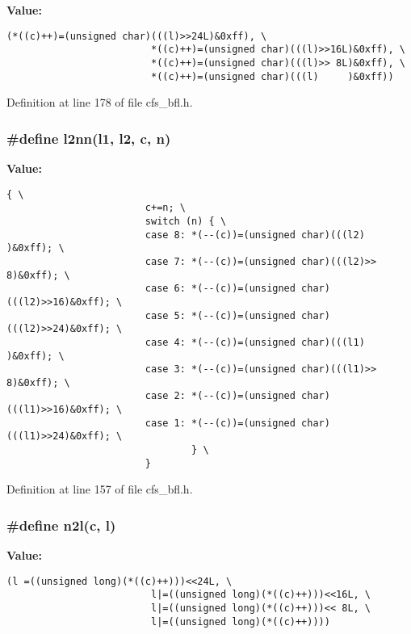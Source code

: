 {\bf Value:}

\footnotesize\begin{verbatim}(*((c)++)=(unsigned char)(((l)>>24L)&0xff), \
                         *((c)++)=(unsigned char)(((l)>>16L)&0xff), \
                         *((c)++)=(unsigned char)(((l)>> 8L)&0xff), \
                         *((c)++)=(unsigned char)(((l)     )&0xff))
\end{verbatim}\normalsize 


Definition at line 178 of file cfs\_\-bfl.h.
\subsubsection{\setlength{\rightskip}{0pt plus 5cm}\#define l2nn(l1, l2, {\bf c}, {\bf n})}\label{cfs__bfl_8h_a5}


{\bf Value:}

\footnotesize\begin{verbatim}{ \
                        c+=n; \
                        switch (n) { \
                        case 8: *(--(c))=(unsigned char)(((l2)    )&0xff); \
                        case 7: *(--(c))=(unsigned char)(((l2)>> 8)&0xff); \
                        case 6: *(--(c))=(unsigned char)(((l2)>>16)&0xff); \
                        case 5: *(--(c))=(unsigned char)(((l2)>>24)&0xff); \
                        case 4: *(--(c))=(unsigned char)(((l1)    )&0xff); \
                        case 3: *(--(c))=(unsigned char)(((l1)>> 8)&0xff); \
                        case 2: *(--(c))=(unsigned char)(((l1)>>16)&0xff); \
                        case 1: *(--(c))=(unsigned char)(((l1)>>24)&0xff); \
                                } \
                        }
\end{verbatim}\normalsize 


Definition at line 157 of file cfs\_\-bfl.h.
\subsubsection{\setlength{\rightskip}{0pt plus 5cm}\#define n2l({\bf c}, {\bf l})}\label{cfs__bfl_8h_a6}


{\bf Value:}

\footnotesize\begin{verbatim}(l =((unsigned long)(*((c)++)))<<24L, \
                         l|=((unsigned long)(*((c)++)))<<16L, \
                         l|=((unsigned long)(*((c)++)))<< 8L, \
                         l|=((unsigned long)(*((c)++))))
\end{verbatim}\normalsize 


